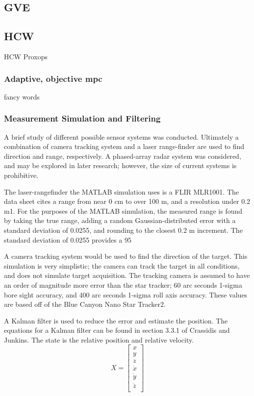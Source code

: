 \documentclass[]{aiaa-tc}%
\begin{document}
\subsection{GVE}

\subsection{HCW}

HCW Proxops

\subsubsection{Adaptive, objective mpc}

fancy words

\subsubsection{Measurement Simulation and Filtering}

A brief study of different possible sensor systems was conducted.  Ultimately a combination of camera tracking system and a laser range-finder are used to find direction and range, respectively.  A phased-array radar system was considered, and may be explored in later research; however, the size of current systems is prohibitive.

The laser-rangefinder the MATLAB simulation uses is a FLIR MLR1001.  The data sheet cites a range from near 0 cm to over 100 m, and a resolution under 0.2 m1.  For the purposes of the MATLAB simulation, the measured range is found by taking the true range, adding a random Gaussian-distributed error with a standard deviation of 0.0255, and rounding to the closest 0.2 m increment.  The standard deviation of 0.0255 provides a 95%

A camera tracking system would be used to find the direction of the target.  This simulation is very simplistic; the camera can track the target in all conditions, and does not simulate target acquisition.  The tracking camera is assumed to have an order of magnitude more error than the star tracker; 60 arc seconds 1-sigma bore sight accuracy, and 400 arc seconds 1-sigma roll axis accuracy.  These values are based off of the Blue Canyon Nano Star Tracker2.

A Kalman filter is used to reduce the error and estimate the position.  The equations for a Kalman filter can be found in section 3.3.1 of Crassidis and Junkins.  The state is the relative position and relative velocity.
\begin{equation}
  X = \begin{bmatrix}
    x \\
    y \\
	z \\         
    \dot{x} \\
    \dot{y} \\
    \dot{z} \\
    \end{bmatrix}
  \end{equation}
  
\end{document}
